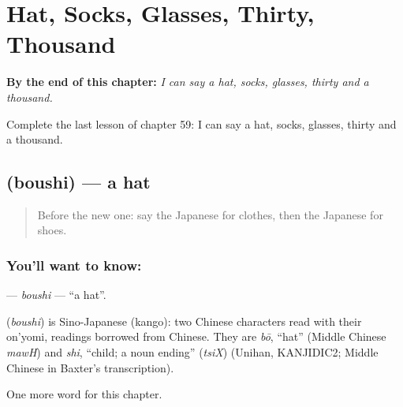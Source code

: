 
\chapter{Hat, Socks, Glasses, Thirty, Thousand}
\label{ch:ja-hat-socks-glasses-thirty-thousand}

\begin{chapteropening}
\textbf{By the end of this chapter:} \emph{I can say a hat, socks, glasses, thirty and a thousand.}

Complete the last lesson of chapter 59: I can say a hat, socks, glasses, thirty and a thousand.
\end{chapteropening}

\section[\texorpdfstring{\ja{ぼうし} (boushi)}{ぼうし (boushi)}]{ (boushi) — a hat}

\label{lesson:JA-C59-boushi}



\begin{quote}
Before the new one: say the Japanese for clothes, then the Japanese for shoes.
\end{quote}

\subsection*{You'll want to know: }
\textbf{} — \emph{boushi} — \textquotedblleft{}a hat\textquotedblright{}.

\begin{cousinweb}
\textbf{} (\emph{boushi}) is Sino-Japanese (kango): two Chinese characters read with their on'yomi, readings borrowed from Chinese. They are \emph{bō}, \textquotedblleft{}hat\textquotedblright{} (Middle Chinese \emph{mawH}) and \emph{shi}, \textquotedblleft{}child; a noun ending\textquotedblright{} (\emph{tsiX}) (Unihan, KANJIDIC2; Middle Chinese in Baxter's transcription).
\end{cousinweb}

\begin{grammarlens}[title={What you've built}]
One more word for this chapter.
\end{grammarlens}

